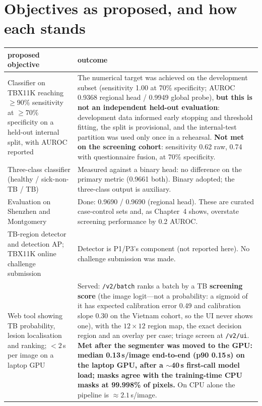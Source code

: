 \documentclass[12pt,a4paper]{report}
\newcommand{\code}[1]{\texttt{#1}}
\begin{document}
\section{Objectives as proposed, and how each stands}
\begin{tabularx}{\textwidth}{@{}LL@{}}\toprule
\textbf{proposed objective} & \textbf{outcome}\\\midrule
Classifier on TBX11K reaching $\geq 90\%$ sensitivity at $\geq 70\%$ specificity on a held-out internal split, with AUROC reported & The numerical target was achieved on the development subset (sensitivity 1.00 at 70\% specificity; AUROC 0.9368 regional head / 0.9949 global probe), \textbf{but this is not an independent held-out evaluation}: development data informed early stopping and threshold fitting, the split is provisional, and the internal-test partition was used only once in a rehearsal. \textbf{Not met on the screening cohort}: sensitivity 0.62 raw, 0.74 with questionnaire fusion, at 70\% specificity.\\
Three-class classifier (healthy / sick-non-TB / TB) & Measured against a binary head: no difference on the primary metric (0.9661 both). Binary adopted; the three-class output is auxiliary.\\
Evaluation on Shenzhen and Montgomery & Done: 0.9690 / 0.9690 (regional head). These are curated case-control sets and, as Chapter~4 shows, overstate screening performance by 0.2 AUROC.\\
TB-region detector and detection AP; TBX11K online challenge submission & Detector is P1/P3's component (not reported here). No challenge submission was made.\\
Web tool showing TB probability, lesion localisation and ranking; $< 2$\,s per image on a laptop GPU & Served: \code{/v2/batch} ranks a batch by a TB \textbf{screening score} (the image logit---not a probability: a sigmoid of it has expected calibration error 0.49 and calibration slope 0.30 on the Vietnam cohort, so the UI never shows one), with the $12\times12$ region map, the exact decision region and an overlay per case; triage screen at \code{/v2/ui}. \textbf{Met after the segmenter was moved to the GPU: median 0.13\,s/image end-to-end (p90 0.15\,s) on the laptop GPU, after a $\sim$40\,s first-call model load; masks agree with the training-time CPU masks at 99.998\% of pixels.} On CPU alone the pipeline is $\approx 2.1$\,s/image.\\\bottomrule
\end{tabularx}
\end{document}
